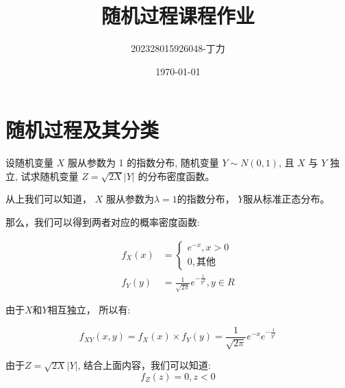 \documentclass[a4,10pt]{ctexart}
\begin{document}
\title{随机过程课程作业}
\author{202328015926048-丁力}
\date{\today}
\maketitle
\tableofcontents
\newpage
{}
\newpage

\section{随机过程及其分类}

\begin{ti}{1}{}

    设随机变量 $X$ 服从参数为 1 的指数分布, 随机变量 $Y \sim N(0,1)$, 
    且 $X$ 与 $Y$ 独立, 试求随机变量 $Z=\sqrt{2 X}|Y|$ 的分布密度函数。
    
    \begin{qj}
    
    从上我们可以知道， $X$ 服从参数为$\lambda=1$的指数分布， 
    $Y$服从标准正态分布。
    
    那么，我们可以得到两者对应的概率密度函数:

    \begin{align}
        f_{X}(x) &= 
        \begin{cases}
            e^{-x} , x>0 \\
            0, \mbox{其他}
        \end{cases}
                \\
        f_{Y}(y) &= \frac{1}{\sqrt{2\pi}} e^{-\frac{1}{y^2}}, y \in R
    \end{align}

    
    由于$X$和$Y$相互独立， 所以有:

\begin{equation}
    f_{XY}(x,y) = f_X(x) \times f_Y(y) =\frac{1}{\sqrt{2\pi}}  e^{-x} e^{-\frac{1}{y^2}}
\end{equation}

                                                                                                                                                                                                                                                                                                                                                                                                                                                                                                                                                                                                                                                                                                                                                                                                                                                                                                                                                                                                             
    由于$Z=\sqrt{2 X}|Y|$, 结合上面内容，我们可以知道:
    \begin{equation}
    f_Z(z) = 0, z<0
    \end{equation}


\end{qj}
\end{ti}
\end{document}
